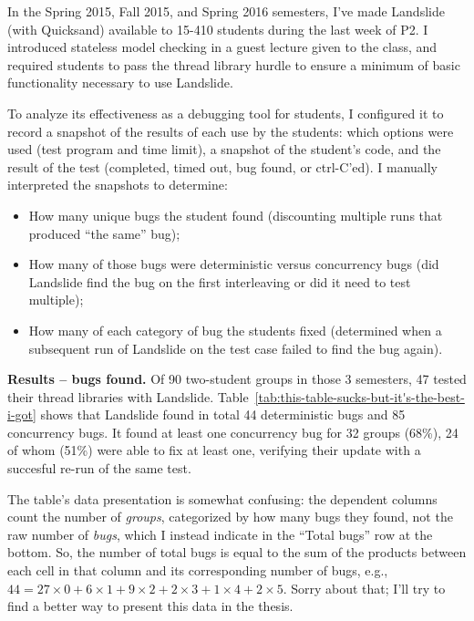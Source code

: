 In the Spring 2015, Fall 2015, and Spring 2016 semesters,
I've made Landslide (with Quicksand) available to 15-410 students during the last week of P2.
I introduced stateless model checking in a guest lecture given to the class,
and required students to pass the thread library hurdle \cite{thrlib}
to ensure a minimum of basic functionality necessary to use Landslide.

To analyze its effectiveness as a debugging tool for students,
I configured it to record a snapshot of the results of each use by the students:
which options were used (test program and time limit),
a snapshot of the student’s code, and the result of the test
(completed, timed out, bug found, or ctrl-C’ed).
I manually interpreted the snapshots to determine:
\begin{itemize}
	\item How many unique bugs the student found (discounting multiple runs that produced ``the same'' bug);
	\item How many of those bugs were deterministic versus concurrency bugs (did Landslide find the bug on the first interleaving or did it need to test multiple);
	\item How many of each category of bug the students fixed (determined when a subsequent run of Landslide on the test case failed to find the bug again).
\end{itemize}

{\bf Results -- bugs found.}
Of 90 two-student groups in those 3 semesters, 47 tested their thread libraries with Landslide.
Table~\ref{tab:this-table-sucks-but-it's-the-best-i-got} shows
that Landslide found in total 44 deterministic bugs and 85 concurrency bugs.
It found at least one concurrency bug for 32 groups (68\%),
24 of whom (51\%) were able to fix at least one, verifying their update
with a succesful re-run of the same test.

The table's data presentation is somewhat confusing:
the dependent columns count the number of {\em groups}, categorized by how many bugs they found, not the raw number of {\em bugs},
which I instead indicate in the ``Total bugs'' row at the bottom.
So, the number of total bugs is equal to the sum of the products between each cell in that column and its corresponding number of bugs,
e.g., $44 = 27\times0 + 6\times1 + 9\times2 + 2\times3 + 1\times4 + 2\times5$.
Sorry about that; I'll try to find a better way to present this data in the thesis.

